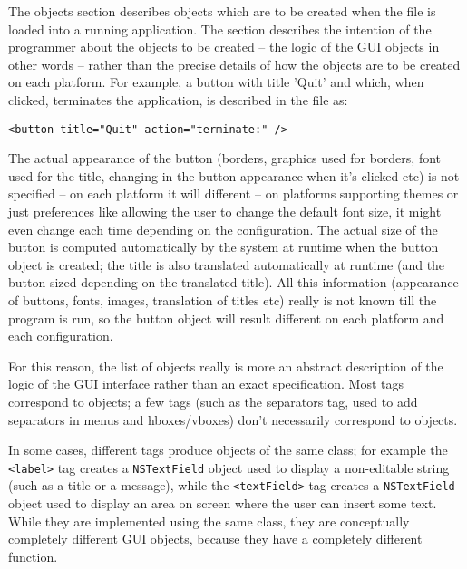 The objects section describes objects which are to be created when the
file is loaded into a running application.  The section describes the
intention of the programmer about the objects to be created -- the
logic of the GUI objects in other words -- rather than the precise
details of how the objects are to be created on each platform.  For
example, a button with title 'Quit' and which, when clicked,
terminates the application, is described in the file as:
\begin{verbatim}
<button title="Quit" action="terminate:" />
\end{verbatim}
The actual appearance of the button (borders, graphics used for
borders, font used for the title, changing in the button appearance
when it's clicked etc) is not specified -- on each platform it will
different -- on platforms supporting themes or just preferences like
allowing the user to change the default font size, it might even
change each time depending on the configuration.  The actual size of
the button is computed automatically by the system at runtime when the
button object is created; the title is also translated automatically
at runtime (and the button sized depending on the translated title).
All this information (appearance of buttons, fonts, images,
translation of titles etc) really is not known till the program is
run, so the button object will result different on each platform and
each configuration.

For this reason, the list of objects really is more an abstract
description of the logic of the GUI interface rather than an exact
specification.  Most tags correspond to objects; a few tags (such as
the separators tag, used to add separators in menus and hboxes/vboxes)
don't necessarily correspond to objects.

In some cases, different tags produce objects of the same class; for
example the \texttt{<label>} tag creates a \texttt{NSTextField} object
used to display a non-editable string (such as a title or a message),
while the \texttt{<textField>} tag creates a \texttt{NSTextField}
object used to display an area on screen where the user can insert
some text.  While they are implemented using the same class, they are
conceptually completely different GUI objects, because they have a
completely different function.

